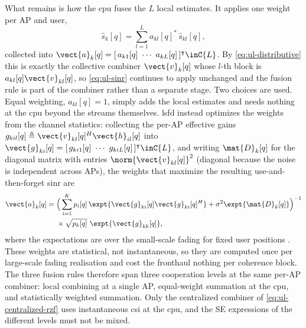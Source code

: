 What remains is how the \gls{cpu} fuses the $L$ local estimates. It applies one
weight per AP and user,
\begin{equation}
\label{eq:ul-lsfd}
\hat{s}_{k}[q] = \sum_{l=1}^{L} a_{kl}[q]^{*}\,\hat{s}_{kl}[q],
\end{equation}
collected into $\vect{a}_{k}[q]=[\,a_{k1}[q]\ \cdots\ a_{kL}[q]\,]^{\intercal}
\inC{L}$. By \eqref{eq:ul-distributive} this is exactly the collective combiner
$\vect{v}_{k}[q]$ whose $l$-th block is $a_{kl}[q]\vect{v}_{kl}[q]$, so
\eqref{eq:ul-sinr} continues to apply unchanged and the fusion rule is part of the
combiner rather than a separate stage. Two choices are used. Equal weighting,
$a_{kl}[q]=1$, simply adds the local estimates and needs nothing at the \gls{cpu}
beyond the streams themselves. \Gls{lsfd} instead optimizes the weights from the
channel statistics: collecting the per-AP effective gains
$g_{kil}[q]\triangleq\vect{v}_{kl}[q]^{H}\vect{h}_{il}[q]$ into
$\vect{g}_{ki}[q]=[\,g_{ki1}[q]\ \cdots\ g_{kiL}[q]\,]^{\intercal}\inC{L}$, and
writing $\mat{D}_{k}[q]$ for the diagonal matrix with entries
$\norm{\vect{v}_{kl}[q]}^{2}$ (diagonal because the noise is independent across
APs), the weights that maximize the resulting use-and-then-forget \gls{sinr} are
\begin{align}
\label{eq:ul-lsfd-weights}
\vect{a}_{k}[q] ={}& \Big(\sum_{i=1}^{K} p_{i}[q]\,
\expt{\vect{g}_{ki}[q]\vect{g}_{ki}[q]^{H}}
+ \sigma^{2}\expt{\mat{D}_{k}[q]}\Big)^{-1} \nonumber\\
&\times \sqrt{p_{k}[q]}\ \expt{\vect{g}_{kk}[q]},
\end{align}
where the expectations are over the small-scale fading for fixed user positions
\cite{demir2021foundations}.
These weights are statistical, not instantaneous, so they are computed once per
large-scale fading realisation and cost the fronthaul nothing per coherence
block. The three fusion rules therefore span three cooperation levels at the same
per-AP combiner: local combining at a single AP, equal-weight summation at the
\gls{cpu}, and statistically weighted summation. Only the centralized combiner of
\eqref{eq:ul-centralized-rzf} uses instantaneous \gls{csi} at the \gls{cpu}, and
the SE expressions of the different levels must not be mixed.

